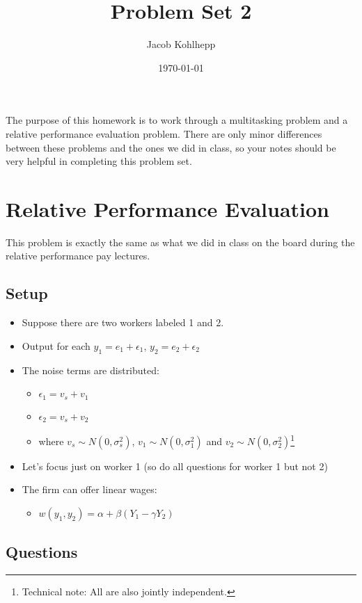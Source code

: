 \documentclass{article}
\title{Problem Set 2}
\author{Jacob Kohlhepp}
\date{\today}
\begin{document}
\maketitle


The purpose of this homework is to work through a multitasking problem and a relative performance evaluation problem. There are only minor differences between these problems and the ones we did in class, so your notes should be very helpful in completing this problem set.

\section{Relative Performance Evaluation}

This problem is exactly the same as what we did in class on the board during the relative performance pay lectures.

\subsection{Setup}
\begin{itemize}
    \item Suppose there are two workers labeled 1 and 2.
    \item Output for each $y_1=e_1 + \epsilon_1$, $y_2=e_2 + \epsilon_2$
    \item The noise terms are distributed:
    \begin{itemize}
        \item $\epsilon_1= v_s + v_1$
        \item $\epsilon_2= v_s + v_2$
        \item where $v_s \sim N(0,\sigma^2_{s})$, $v_1 \sim N(0,\sigma^2_{1})$ and $v_2 \sim N(0,\sigma^2_{2})$\footnote{Technical note: All are also jointly independent.}
    \end{itemize}
    \item Let's focus just on worker 1 (so do all questions for worker 1 but not 2)
    \item The firm can offer linear wages:
    \begin{itemize}
        \item $w(y_1, y_{2}) = \alpha + \beta (Y_1 - \gamma Y_2)$
    \end{itemize}
\end{itemize}

\subsection{Questions}
\end{document}
